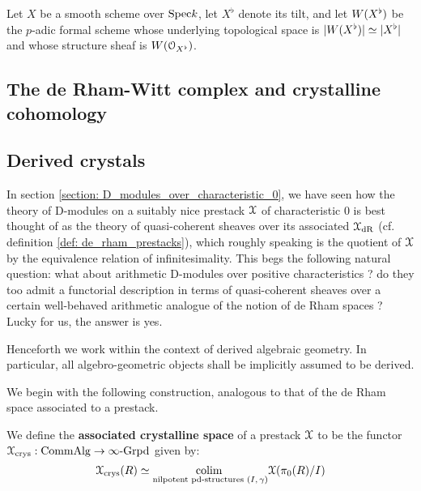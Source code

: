             Let $X$ be a smooth scheme over $\mathrm{Spec} k$, let $X^{\flat}$ denote its tilt, and let $W(X^{\flat})$ be the $p$-adic formal scheme whose underlying topological space is $|W(X^{\flat})| \simeq |X^{\flat}|$ and whose structure sheaf is $W(\mathcal{O}_{X^{\flat}})$. 
        
        \subsection{The de Rham-Witt complex and crystalline cohomology}
        
        \subsection{Derived crystals}
            In section \ref{section: D_modules_over_characteristic_0}, we have seen how the theory of D-modules on a suitably nice prestack $\mathcal{X}$ of characteristic $0$ is best thought of as the theory of quasi-coherent sheaves over its associated  $\mathcal{X}_{\mathrm{dR}}$ (cf. definition \ref{def: de_rham_prestacks}), which roughly speaking is the quotient of $\mathcal{X}$ by the equivalence relation of infinitesimality. This begs the following natural question: what about arithmetic D-modules over positive characteristics ? do they too admit a functorial description in terms of quasi-coherent sheaves over a certain well-behaved arithmetic analogue of the notion of de Rham spaces ? Lucky for us, the answer is yes.
                
            \begin{convention}
                Henceforth we work within the context of derived algebraic geometry. In particular, all algebro-geometric objects shall be implicitly assumed to be derived.
            \end{convention}
            
            We begin with the following construction, analogous to that of the de Rham space associated to a prestack.
            \begin{definition} \label{def: crystalline_space}
                We define the \textbf{associated crystalline space} of a prestack $\mathcal{X}$ to be the functor $\mathcal{X}_{\mathrm{crys}}: \mathrm{Comm}\mathrm{Alg} \to \infty\text{-}\mathrm{Grpd}$ given by:
                    $$\mathcal{X}_{\mathrm{crys}}(R) \simeq \underset{\text{nilpotent pd-structures $(I, \gamma)$}}{\operatorname{colim} \:} \mathcal{X}(\pi_0(R)/I)$$
            \end{definition}
        
